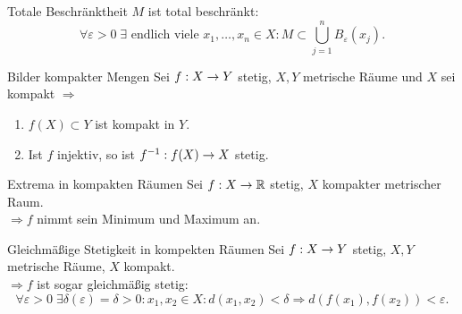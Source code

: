 \documentclass[main.tex]{subfiles}
\begin{document}
\begin{karte}{Totale Beschränktheit}
    \(M\) ist total beschränkt: 
    \[ \forall \varepsilon > 0 \; 
    \exists \text{ endlich viele } x_1,\dots,x_n \in X:
    M \subset \bigcup_{j=1}^n B_\varepsilon(x_j). \]
\end{karte}

\begin{karte}{Bilder kompakter Mengen}
    Sei \( f : X \rightarrow Y \) stetig, \( X, Y \) metrische Räume
    und \(X\) sei kompakt
    \( \Rightarrow \)
    \begin{enumerate}
        \item \( f(X) \subset Y \) ist kompakt in \( Y \).
        \item Ist \(f\) injektiv, so ist \( f^{-1} : f(X) \rightarrow X \)
        stetig.
    \end{enumerate}
\end{karte}

\begin{karte}{Extrema in kompakten Räumen}
    Sei \( f : X \rightarrow \mathbb{R} \) stetig, \( X \) kompakter 
    metrischer Raum.\\
    \( \Rightarrow f \) nimmt sein Minimum und 
    Maximum an.
\end{karte}

\begin{karte}{Gleichmäßige Stetigkeit in kompekten Räumen}
    Sei \( f : X \rightarrow Y \) stetig, 
    \( X, Y \) metrische Räume, \(X\)
    kompakt. \\
    \( \Rightarrow f \) ist sogar gleichmäßig 
    stetig:
    \[ \forall \varepsilon > 0\; \exists 
    \delta(\varepsilon) = \delta > 0:
    x_1, x_2 \in X: d(x_1, x_2) < \delta
    \Rightarrow d(f(x_1), f(x_2)) < \varepsilon. \]
\end{karte}
\end{document}
